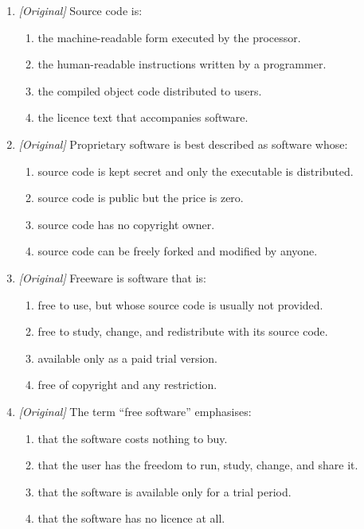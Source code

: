 \documentclass[11pt]{article}
\begin{document}
\begin{enumerate}[label=\textbf{Q\arabic*.}, leftmargin=*]
\begin{enumerate}[label=\Alph*.]
    \item use the software without any licence conditions at all.
  \end{enumerate}
\item \textit{[Original]} Source code is:
  \begin{enumerate}[label=\Alph*.]
    \item the machine-readable form executed by the processor.
    \item the human-readable instructions written by a programmer.
    \item the compiled object code distributed to users.
    \item the licence text that accompanies software.
  \end{enumerate}
\item \textit{[Original]} Proprietary software is best described as software
  whose:
  \begin{enumerate}[label=\Alph*.]
    \item source code is kept secret and only the executable is distributed.
    \item source code is public but the price is zero.
    \item source code has no copyright owner.
    \item source code can be freely forked and modified by anyone.
  \end{enumerate}
\item \textit{[Original]} Freeware is software that is:
  \begin{enumerate}[label=\Alph*.]
    \item free to use, but whose source code is usually not provided.
    \item free to study, change, and redistribute with its source code.
    \item available only as a paid trial version.
    \item free of copyright and any restriction.
  \end{enumerate}
\item \textit{[Original]} The term ``free software'' emphasises:
  \begin{enumerate}[label=\Alph*.]
    \item that the software costs nothing to buy.
    \item that the user has the freedom to run, study, change, and share it.
    \item that the software is available only for a trial period.
    \item that the software has no licence at all.

\end{enumerate}
\end{enumerate}
\end{document}
